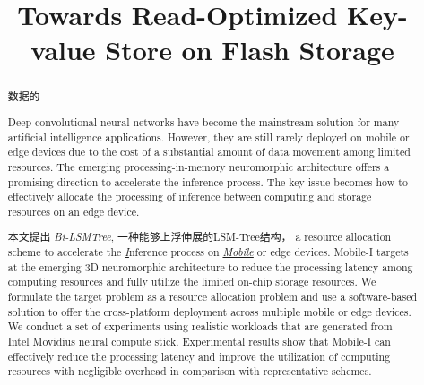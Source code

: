 \documentclass[conference]{IEEEtran}
\begin{document}
\title{
Towards Read-Optimized Key-value Store on Flash Storage
}

\author{
}

\maketitle


\begin{abstract}
%

数据的

Deep convolutional neural networks have become the mainstream
solution for many artificial intelligence applications.
However, they are still rarely deployed on mobile or edge devices
due to the cost of a substantial amount of data movement
among limited resources.
The emerging processing-in-memory neuromorphic architecture
offers a promising direction
to accelerate the inference process.
The key issue becomes how to effectively allocate
the processing of inference between computing and storage resources
on an edge device.

本文提出 \emph{Bi-LSMTree}, 一种能够上浮伸展的LSM-Tree结构，
a resource allocation scheme to accelerate the \emph{\underline{I}}nference process on
\emph{\underline{Mobile}} or edge devices.
Mobile-I targets at the emerging 3D neuromorphic architecture
to reduce the processing latency among computing resources
and fully utilize the limited on-chip storage resources.
We formulate the target problem as a resource allocation problem
and use a software-based solution to offer the cross-platform deployment
across multiple mobile or edge devices.
We conduct a set of experiments using realistic workloads
that are generated from Intel Movidius neural compute stick.
Experimental results show that Mobile-I
can effectively reduce the processing latency
and improve the utilization of computing resources
with negligible overhead in comparison
with representative schemes.


\end{abstract}
\end{document}
